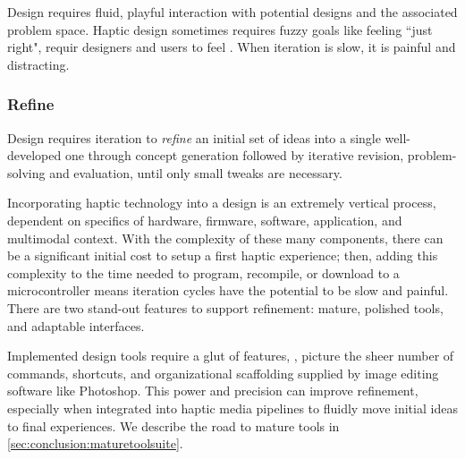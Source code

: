 Design requires fluid, playful interaction with potential designs and the associated problem space.
Haptic design sometimes requires fuzzy goals like feeling ``just right", requir designers and users to feel .
When iteration is slow, it is painful and distracting.


%
%
\subsubsection{Refine}
Design requires iteration to \emph{refine} an initial set of ideas into a single well-developed one through concept generation followed by iterative revision, problem-solving and  evaluation, until only small tweaks are necessary.

Incorporating haptic technology into a design is an extremely vertical process,  dependent on  specifics of hardware, firmware, software, application, and multimodal context.
With the complexity of these many components, there can be a significant initial cost to setup a first haptic experience; then, adding this complexity to the time needed to program, recompile, or download to a microcontroller means iteration cycles have the potential to be slow and painful. 
There are two stand-out features to support refinement: mature, polished tools, and adaptable interfaces.
%

Implemented design tools require a glut of features, \eg, picture the sheer number of commands, shortcuts, and organizational scaffolding supplied by image editing software like Photoshop.
This power and precision can improve refinement, especially when integrated into haptic media pipelines to fluidly move initial ideas to final experiences. 
We describe the road to mature tools in \autoref{sec:conclusion:maturetoolsuite}.


